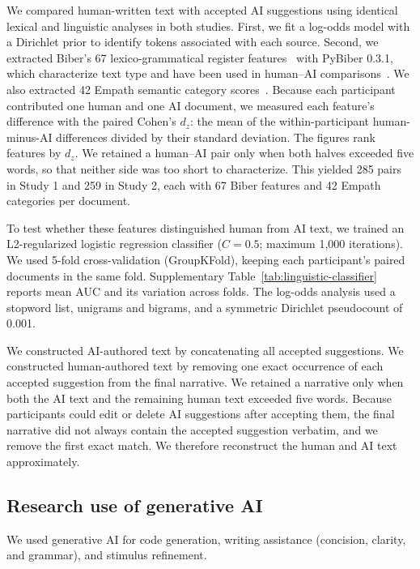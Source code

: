 \documentclass[11pt]{article}
\begin{document}
We compared human-written text with accepted AI suggestions using identical lexical and linguistic analyses in both studies. First, we fit a log-odds model with a Dirichlet prior to identify tokens associated with each source. Second, we extracted Biber's 67 lexico-grammatical register features~\cite{biber_using_1993} with PyBiber 0.3.1, which characterize text type and have been used in human--AI comparisons~\cite{sourati_shrinking_2026}. We also extracted 42 Empath semantic category scores~\citep{fast_empath_2016}. Because each participant contributed one human and one AI document, we measured each feature's difference with the paired Cohen's $d_z$: the mean of the within-participant human-minus-AI differences divided by their standard deviation. The figures rank features by $d_z$. We retained a human--AI pair only when both halves exceeded five words, so that neither side was too short to characterize. This yielded 285 pairs in Study 1 and 259 in Study 2, each with 67 Biber features and 42 Empath categories per document.

To test whether these features distinguished human from AI text, we trained an L2-regularized logistic regression classifier ($C=0.5$; maximum 1,000 iterations). We used 5-fold cross-validation (GroupKFold), keeping each participant's paired documents in the same fold. Supplementary Table~\ref{tab:linguistic-classifier} reports mean AUC and its variation across folds. The log-odds analysis used a stopword list, unigrams and bigrams, and a symmetric Dirichlet pseudocount of 0.001.

We constructed AI-authored text by concatenating all accepted suggestions. We constructed human-authored text by removing one exact occurrence of each accepted suggestion from the final narrative. We retained a narrative only when both the AI text and the remaining human text exceeded five words. Because participants could edit or delete AI suggestions after accepting them, the final narrative did not always contain the accepted suggestion verbatim, and we remove the first exact match. We therefore reconstruct the human and AI text approximately.


\subsection{Research use of generative AI}
\label{sec:methods-research-use-of-generative-ai}

We used generative AI for code generation, writing assistance (concision, clarity, and grammar), and stimulus refinement.
\end{document}
